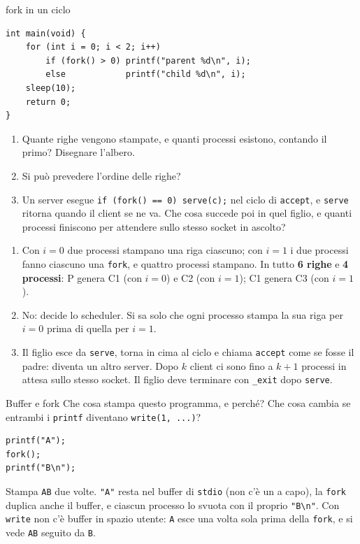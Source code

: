 \begin{esercizio}{fork in un ciclo}
\begin{lstlisting}[language={[POSIX]C}]
int main(void) {
    for (int i = 0; i < 2; i++)
        if (fork() > 0) printf("parent %d\n", i);
        else            printf("child %d\n", i);
    sleep(10);
    return 0;
}
\end{lstlisting}
\begin{enumerate}[label=(\alph*)]
    \item Quante righe vengono stampate, e quanti processi esistono, contando il primo? Disegnare l'albero.
    \item Si può prevedere l'ordine delle righe?
    \item Un server esegue \texttt{if (fork() == 0) serve(c);} nel ciclo di \texttt{accept}, e \texttt{serve} ritorna quando il client se
          ne va. Che cosa succede poi in quel figlio, e quanti processi finiscono per attendere sullo stesso socket in ascolto?
\end{enumerate}

\svolgimento
\begin{enumerate}[label=(\alph*)]
    \item Con $i = 0$ due processi stampano una riga ciascuno; con $i = 1$ i due processi fanno ciascuno una \texttt{fork}, e quattro
          processi stampano. In tutto \textbf{6 righe} e \textbf{4 processi}: P genera C1 (con $i=0$) e C2 (con $i=1$); C1 genera C3 (con
          $i=1$).
    \item No: decide lo scheduler. Si sa solo che ogni processo stampa la sua riga per $i=0$ prima di quella per $i=1$.
    \item Il figlio esce da \texttt{serve}, torna in cima al ciclo e chiama \texttt{accept} come se fosse il padre: diventa un altro server.
          Dopo $k$ client ci sono fino a $k+1$ processi in attesa sullo stesso socket. Il figlio deve terminare con \texttt{\_exit} dopo
          \texttt{serve}.
\end{enumerate}
\end{esercizio}

\begin{esercizio}{Buffer e fork}
Che cosa stampa questo programma, e perché? Che cosa cambia se entrambi i \texttt{printf} diventano \texttt{write(1, ...)}?
\begin{lstlisting}[language={[POSIX]C}]
printf("A");
fork();
printf("B\n");
\end{lstlisting}

\svolgimento
Stampa \texttt{AB} due volte. \texttt{"A"} resta nel buffer di \texttt{stdio} (non c'è un a capo), la \texttt{fork} duplica anche il buffer,
e ciascun processo lo svuota con il proprio \texttt{"B\textbackslash n"}. Con \texttt{write} non c'è buffer in spazio utente:
\texttt{A} esce una volta sola prima della \texttt{fork}, e si vede \texttt{AB} seguito da \texttt{B}.
\end{esercizio}


